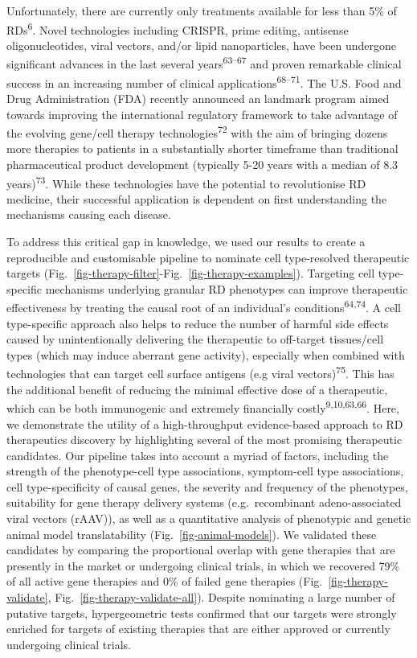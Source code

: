 \documentclass[
]{agujournal2019}
\begin{document}
Unfortunately, there are currently only treatments available for less
than 5\% of RDs\textsuperscript{6}. Novel technologies including CRISPR,
prime editing, antisense oligonucleotides, viral vectors, and/or lipid
nanoparticles, have been undergone significant advances in the last
several years\textsuperscript{63--67} and proven remarkable clinical
success in an increasing number of clinical
applications\textsuperscript{68--71}. The U.S. Food and Drug
Administration (FDA) recently announced an landmark program aimed
towards improving the international regulatory framework to take
advantage of the evolving gene/cell therapy
technologies\textsuperscript{72} with the aim of bringing dozens more
therapies to patients in a substantially shorter timeframe than
traditional pharmaceutical product development (typically 5-20 years
with a median of 8.3 years)\textsuperscript{73}. While these
technologies have the potential to revolutionise RD medicine, their
successful application is dependent on first understanding the
mechanisms causing each disease.

To address this critical gap in knowledge, we used our results to create
a reproducible and customisable pipeline to nominate cell type-resolved
therapeutic targets
(Fig.~\ref{fig-therapy-filter}-Fig.~\ref{fig-therapy-examples}).
Targeting cell type-specific mechanisms underlying granular RD
phenotypes can improve therapeutic effectiveness by treating the causal
root of an individual's conditions\textsuperscript{64,74}. A cell
type-specific approach also helps to reduce the number of harmful side
effects caused by unintentionally delivering the therapeutic to
off-target tissues/cell types (which may induce aberrant gene activity),
especially when combined with technologies that can target cell surface
antigens (e.g viral vectors)\textsuperscript{75}. This has the
additional benefit of reducing the minimal effective dose of a
therapeutic, which can be both immunogenic and extremely financially
costly\textsuperscript{9,10,63,66}. Here, we demonstrate the utility of
a high-throughput evidence-based approach to RD therapeutics discovery
by highlighting several of the most promising therapeutic candidates.
Our pipeline takes into account a myriad of factors, including the
strength of the phenotype-cell type associations, symptom-cell type
associations, cell type-specificity of causal genes, the severity and
frequency of the phenotypes, suitability for gene therapy delivery
systems (e.g.~recombinant adeno-associated viral vectors (rAAV)), as
well as a quantitative analysis of phenotypic and genetic animal model
translatability (Fig.~\ref{fig-animal-models}). We validated these
candidates by comparing the proportional overlap with gene therapies
that are presently in the market or undergoing clinical trials, in which
we recovered 79\% of all active gene therapies and 0\% of failed gene
therapies (Fig.~\ref{fig-therapy-validate},
Fig.~\ref{fig-therapy-validate-all}). Despite nominating a large number
of putative targets, hypergeometric tests confirmed that our targets
were strongly enriched for targets of existing therapies that are either
approved or currently undergoing clinical trials.
\end{document}
